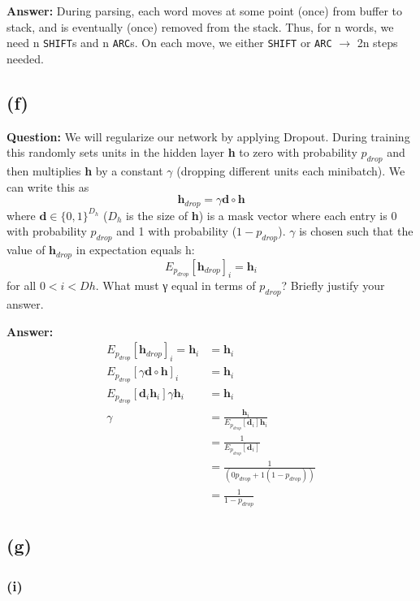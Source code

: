 \documentclass[11pt]{article}
\begin{document}
\textbf{Answer:} During parsing, each word moves at some point (once) from buffer to stack, and is eventually (once) removed from the stack. Thus, for n words, we need n \verb|SHIFT|s and n \verb|ARC|s. On each move, we either \verb|SHIFT| or \verb|ARC| $\to$ 2n steps needed.

\subsection*{(f)}
\textbf{Question:} We will regularize our network by applying Dropout. During training this randomly sets units in the hidden layer \textbf{h} to zero with probability $p_{drop}$ and then multiplies \textbf{h} by a constant $\gamma$ (dropping different units each minibatch). We can write this as \[\mathbf{h}_{drop} = \gamma \mathbf{d} \circ \mathbf{h}\] where $\mathbf{d} \in {\{0, 1\}}^{D_h}$ ($D_h$ is the size of \textbf{h}) is a mask vector where each entry is 0 with probability $p_{drop}$ and 1 with probability ($1 - p_{drop}$). $\gamma$ is chosen such that the value of $\mathbf{h}_{drop}$ in expectation equals h: \[E_{p_{drop}} [\mathbf{h}_{drop}]_i = \mathbf{h}_i\]
for all $0 < i < Dh$. What must γ equal in terms of $p_{drop}$? Briefly justify your answer.

\textbf{Answer:}
\begin{equation*}
  \begin{split}
    E_{p_{drop}} [\mathbf{h}_{drop}]_i = \mathbf{h}_i   &= \mathbf{h}_i \\
    E_{p_{drop}} [\gamma \mathbf{d} \circ \mathbf{h}]_i &= \mathbf{h}_i \\
    E_{p_{drop}} [\mathbf{d}_i \mathbf{h}_i] \gamma \mathbf{h}_i &= \mathbf{h}_i  \\
    \gamma &= \frac{ \mathbf{h}_i }{ E_{p_{drop}} [\mathbf{d}_i] \mathbf{h}_i }  \\
    &= \frac{ 1 }{ E_{p_{drop}} [\mathbf{d}_i] } \\
    &= \frac{ 1 }{ (0p_{drop} + 1(1-p_{drop})) } \\
    &= \frac{ 1 }{ 1-p_{drop} }
  \end{split}
\end{equation*}

\subsection*{(g)}
\subsubsection*{(i)}
\end{document}
